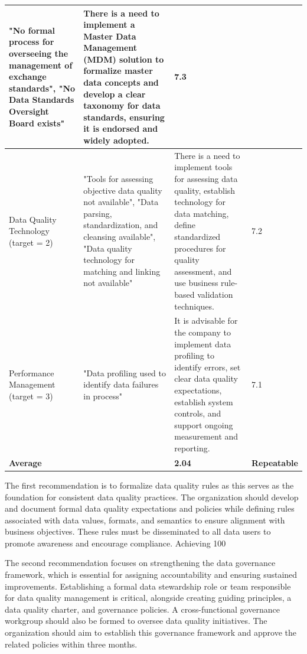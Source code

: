 \documentclass[conference]{IEEEtran}
\begin{document}
\begin{table}[hbt!]
\begin{tabular}{|p{2cm}|p{5cm}|p{5cm}|p{2cm}|}
"No formal process for overseeing the management of exchange standards", 
"No Data Standards Oversight Board exists"
& 
There is a need to implement a Master Data Management (MDM) solution to formalize master data concepts and develop a clear taxonomy for data standards, ensuring it is endorsed and widely adopted.
& 7.3 \\
\hline
Data Quality Technology (target = 2) & 
"Tools for assessing objective data quality not available", 
"Data parsing, standardization, and cleansing available", 
"Data quality technology for matching and linking not available"
& 
There is a need to implement tools for assessing data quality, establish technology for data matching, define standardized procedures for quality assessment, and use business rule-based validation techniques.
& 7.2 \\

\hline
Performance Management (target = 3) & "Data profiling used to identify data failures in process" & It is advisable for the company to implement data profiling to identify errors, set clear data quality expectations, establish system controls, and support ongoing measurement and reporting. & 7.1 \\
\hline
\multicolumn{2}{|l|}{\textbf{Average}} & \textbf{2.04} & \textbf{Repeatable} \\
\hline
\end{tabular}
\end{table}



The first recommendation is to formalize data quality rules as this serves as the foundation for consistent data quality practices. The organization should develop and document formal data quality expectations and policies while defining rules associated with data values, formats, and semantics to ensure alignment with business objectives. These rules must be disseminated to all data users to promote awareness and encourage compliance. Achieving 100%

The second recommendation focuses on strengthening the data governance framework, which is essential for assigning accountability and ensuring sustained improvements. Establishing a formal data stewardship role or team responsible for data quality management is critical, alongside creating guiding principles, a data quality charter, and governance policies. A cross-functional governance workgroup should also be formed to oversee data quality initiatives. The organization should aim to establish this governance framework and approve the related policies within three months.
\end{document}
